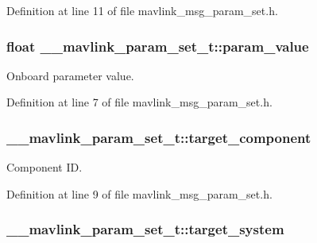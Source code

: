 Definition at line 11 of file mavlink\-\_\-msg\-\_\-param\-\_\-set.\-h.

\hypertarget{struct____mavlink__param__set__t_a210adccaf668137e5f083c825804276e}{
\subsubsection[{param\-\_\-value}]{\setlength{\rightskip}{0pt plus 5cm}float \-\_\-\-\_\-mavlink\-\_\-param\-\_\-set\-\_\-t\-::param\-\_\-value}}\label{struct____mavlink__param__set__t_a210adccaf668137e5f083c825804276e}


Onboard parameter value. 



Definition at line 7 of file mavlink\-\_\-msg\-\_\-param\-\_\-set.\-h.

\hypertarget{struct____mavlink__param__set__t_ad1526f09aefc29226f2362a2a0963237}{
\subsubsection[{target\-\_\-component}]{ \-\_\-\-\_\-mavlink\-\_\-param\-\_\-set\-\_\-t\-::target\-\_\-component}}\label{struct____mavlink__param__set__t_ad1526f09aefc29226f2362a2a0963237}


Component I\-D. 



Definition at line 9 of file mavlink\-\_\-msg\-\_\-param\-\_\-set.\-h.

\hypertarget{struct____mavlink__param__set__t_a501eee1b0a93fa7affad440d51bbab90}{
\subsubsection[{target\-\_\-system}]{ \-\_\-\-\_\-mavlink\-\_\-param\-\_\-set\-\_\-t\-::target\-\_\-system}}\label{struct____mavlink__param__set__t_a501eee1b0a93fa7affad440d51bbab90}


